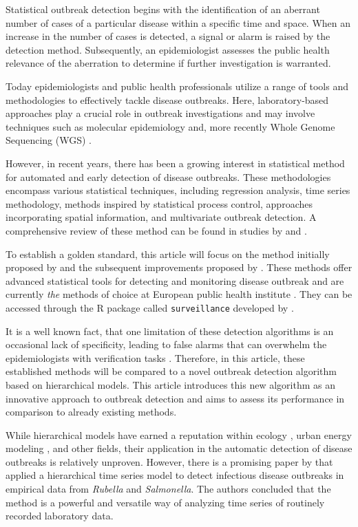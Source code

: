 \documentclass[preprint, 3p, authoryear]{elsarticle} %
\begin{document}
Statistical outbreak detection begins with the identification of an aberrant number of cases of a particular disease within a specific time and space. When an increase in the number of cases is detected, a signal or alarm is raised by the detection method. Subsequently, an epidemiologist assesses the public health relevance of the aberration to determine if further investigation is warranted.

Today epidemiologists and public health professionals utilize a range of tools and methodologies to effectively tackle disease outbreaks. Here, laboratory-based approaches play a crucial role in outbreak investigations and may involve techniques such as molecular epidemiology \citep[\citet{Struelens_2013}]{Honardoost_2018} and, more recently Whole Genome Sequencing (WGS) \citep[\citet{Baldry_2010}]{Koeser_2012}.

However, in recent years, there has been a growing interest in statistical method for automated and early detection of disease outbreaks. These methodologies encompass various statistical techniques, including regression analysis, time series methodology, methods inspired by statistical process control, approaches incorporating spatial information, and multivariate outbreak detection. A comprehensive review of these method can be found in studies by \citet{Buckeridge_2007} and \citet{Unkel_2012}.

To establish a golden standard, this article will focus on the method initially proposed by \citet{Farrington_1996} and the subsequent improvements proposed by \citet{Noufaily_2013}. These methods offer advanced statistical tools for detecting and monitoring disease outbreak and are currently \emph{the} methods of choice at European public health institute \citep{Hulth_2010}. They can be accessed through the R package called \texttt{surveillance} developed by \citet{Salmon_2016}.

It is a well known fact, that one limitation of these detection algorithms is an occasional lack of specificity, leading to false alarms that can overwhelm the epidemiologists with verification tasks \citep{Bedubourg_2017}. Therefore, in this article, these established methods will be compared to a novel outbreak detection algorithm based on hierarchical models. This article introduces this new algorithm as an innovative approach to outbreak detection and aims to assess its performance in comparison to already existing methods.

While hierarchical models have earned a reputation within ecology \citep[\citet{Zuur_2009}]{Bolker_2009}, urban energy modeling \citep[\citet{Jaume_2022}]{Real_2021}, and other fields, their application in the automatic detection of disease outbreaks is relatively unproven. However, there is a promising paper by \citet{Heisterkamp_2006} that applied a hierarchical time series model to detect infectious disease outbreaks in empirical data from \emph{Rubella} and \emph{Salmonella}. The authors concluded that the method is a powerful and versatile way of analyzing time series of routinely recorded laboratory data.
\end{document}
